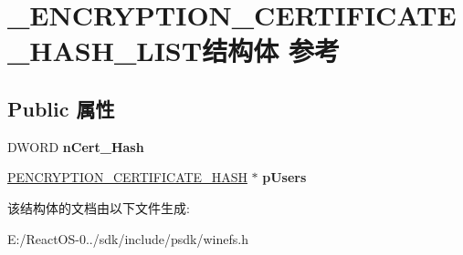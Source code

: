 \hypertarget{struct___e_n_c_r_y_p_t_i_o_n___c_e_r_t_i_f_i_c_a_t_e___h_a_s_h___l_i_s_t}{}\section{\+\_\+\+E\+N\+C\+R\+Y\+P\+T\+I\+O\+N\+\_\+\+C\+E\+R\+T\+I\+F\+I\+C\+A\+T\+E\+\_\+\+H\+A\+S\+H\+\_\+\+L\+I\+S\+T结构体 参考}
\label{struct___e_n_c_r_y_p_t_i_o_n___c_e_r_t_i_f_i_c_a_t_e___h_a_s_h___l_i_s_t}
\subsection*{Public 属性}
\begin{DoxyCompactItemize}
\item 
\mbox{\label{struct___e_n_c_r_y_p_t_i_o_n___c_e_r_t_i_f_i_c_a_t_e___h_a_s_h___l_i_s_t_a6f438e6c4681372585ce9759cff1810b}} 
D\+W\+O\+RD {\bfseries n\+Cert\+\_\+\+Hash}
\item 
\mbox{\label{struct___e_n_c_r_y_p_t_i_o_n___c_e_r_t_i_f_i_c_a_t_e___h_a_s_h___l_i_s_t_abe79ea695270512bedf85e3aabe834f8}} 
\hyperlink{struct___e_n_c_r_y_p_t_i_o_n___c_e_r_t_i_f_i_c_a_t_e___h_a_s_h}{P\+E\+N\+C\+R\+Y\+P\+T\+I\+O\+N\+\_\+\+C\+E\+R\+T\+I\+F\+I\+C\+A\+T\+E\+\_\+\+H\+A\+SH} $\ast$ {\bfseries p\+Users}
\end{DoxyCompactItemize}


该结构体的文档由以下文件生成\+:\begin{DoxyCompactItemize}
\item 
E\+:/\+React\+O\+S-\/0../sdk/include/psdk/winefs.\+h\end{DoxyCompactItemize}

